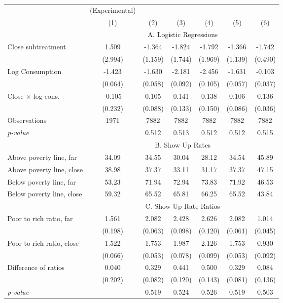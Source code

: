 \begin{tabular}{lcccccc}\toprule & (Experimental) \multicolumn{5}{c}{(See Models Above)} \\ \cmidrule(lr){3-7} 
& (1) & (2) & (3) & (4) & (5) & (6) \\ \midrule
 & \multicolumn{6}{c}{\centering A. Logistic Regressions}\\\cmidrule(lr){2-7} 
Close subtreatment & 1.509 & -1.364 & -1.824 & -1.792 & -1.366 & -1.742 \\ & (2.994) & (1.159) & (1.744) & (1.969) & (1.139) & (0.490) \\Log Consumption & -1.423 & -1.630 & -2.181 & -2.456 & -1.631 & -0.103 \\ & (0.064) & (0.058) & (0.092) & (0.105) & (0.057) & (0.037) \\Close $\times$ log cons. & -0.105 & 0.105 & 0.141 & 0.138 & 0.106 & 0.136 \\ & (0.232) & (0.088) & (0.133) & (0.150) & (0.086) & (0.036) \\Observations & 1971 & 7882& 7882& 7882& 7882& 7882\\\textit{p-value} & & 0.512 & 0.513 & 0.512 & 0.512 & 0.515 \\\midrule
 & \multicolumn{6}{c}{\centering B. Show Up Rates}\\\cmidrule(lr){2-7} 
Above poverty line, far & 34.09 & 34.55 & 30.04 & 28.12 & 34.54 & 45.89 \\Above poverty line, close & 38.98 & 37.37 & 33.11 & 31.17 & 37.37 & 47.15 \\Below poverty line, far & 53.23 & 71.94 & 72.94 & 73.83 & 71.92 & 46.53 \\Below poverty line, close & 59.32 & 65.52 & 65.81 & 66.25 & 65.52 & 43.84 \\\midrule
 & \multicolumn{6}{c}{\centering C. Show Up Rate Ratios}\\\cmidrule(lr){2-7} 
Poor to rich ratio, far & 1.561 & 2.082 & 2.428 & 2.626 & 2.082 & 1.014 \\ & (0.198) & (0.063) & (0.098) & (0.120) & (0.061) & (0.045) \\Poor to rich ratio, close & 1.522 & 1.753 & 1.987 & 2.126 & 1.753 & 0.930 \\ & (0.066) & (0.053) & (0.078) & (0.099) & (0.053) & (0.092) \\Difference of ratios & 0.040 & 0.329 & 0.441 & 0.500 & 0.329 & 0.084 \\ & (0.202) & (0.082) & (0.120) & (0.143) & (0.081) & (0.136) \\\textit{p-value} & & 0.519 & 0.524 & 0.526 & 0.519 & 0.503 \\\bottomrule\end{tabular}